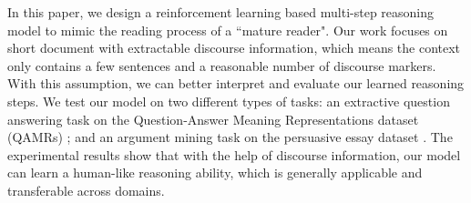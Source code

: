 In this paper, we design a reinforcement learning based multi-step reasoning model to mimic the reading process of a ``mature reader". Our work focuses on short document with extractable discourse information, which means the context only contains a few sentences and a reasonable number of discourse markers. With this assumption, we can better interpret and evaluate our learned reasoning steps. %
We test our model on two different types of tasks: an extractive question answering task on the Question-Answer Meaning Representations dataset (QAMRs) \cite{DBLP:conf/naacl/MichaelSHDZ18}; and an argument mining task \cite{DBLP:conf/lrec/ReedPRM08}  on the persuasive essay dataset \cite{DBLP:conf/coling/StabG14}. The experimental results show that with the help of discourse information, our model can learn a human-like reasoning ability, which is generally applicable and transferable across domains.
